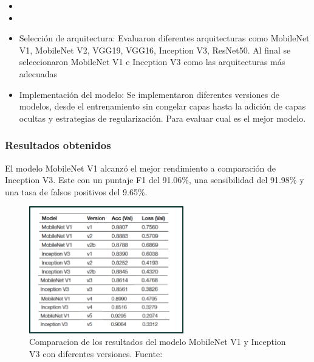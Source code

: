 \newcommand{\MEDthree}{ Selección de arquitectura: Evaluaron diferentes arquitecturas como MobileNet V1, MobileNet V2, VGG19, VGG16, Inception V3, ResNet50. 
Al final se seleccionaron MobileNet V1 e Inception V3 como las arquitecturas más adecuadas
}

\newcommand{\MEDfour}{Implementación del modelo: Se implementaron diferentes versiones de modelos, desde el entrenamiento sin congelar capas hasta la adición de capas ocultas y estrategias de regularización. Para evaluar cual es el mejor modelo.
}


\begin{itemize}
	\item \MEDone
	\item \MEDtwo
	\item \MEDthree
	\item \MEDfour
\end{itemize}

\subsubsection{Resultados obtenidos}
El modelo MobileNet V1 alcanzó el mejor rendimiento a comparación de Inception V3. Este con un puntaje F1 del 91.06\%, una sensibilidad del 91.98\% y una tasa de falsos positivos del 9.65\%. 


\begin{figure}[h]
	\begin{center}
		\includegraphics[width=0.6\textwidth]{2/figuras/Design_tool_the_classification_imagen_01.png}
		\caption{Comparacion de los resultados del modelo MobileNet V1 y Inception V3 con diferentes versiones. Fuente: \cite{vargas_2021diseno}}
		\label{1:fig 7}
	\end{center}
\end{figure}





